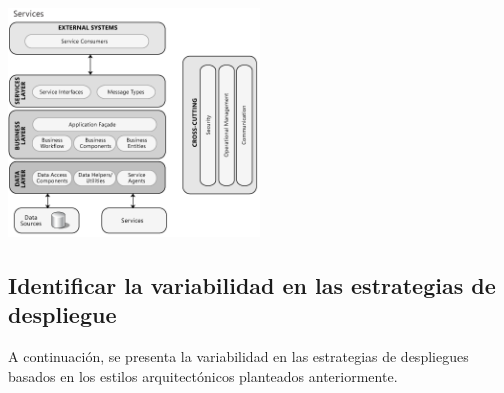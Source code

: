 \documentclass[10pt,a4paper,openany]{book}
\begin{document}
\begin{enumerate}
\begin{itemize}
\end{itemize}
\begin{center}
\includegraphics[width=0.5\textwidth]{arq2}
\end{center}
\end{enumerate}



\subsection{Identificar la variabilidad en las estrategias de despliegue}

A continuación, se presenta la variabilidad en las estrategias de despliegues basados en los estilos arquitectónicos planteados anteriormente. 
\end{document}

